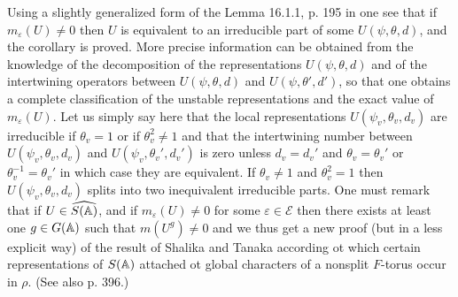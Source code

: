 Using a slightly generalized form of the Lemma 16.1.1, p. 195 in \cite{jacquet1970automorphic} one see that if $m_\varepsilon(U) \ne 0$ then $U$ is equivalent to an irreducible part of some $U(\psi, \theta, d)$, and the corollary is proved.
More precise information can be obtained from the knowledge of the decomposition of the representations $U(\psi, \theta, d)$ and of the intertwining operators between $U(\psi, \theta, d)$ and $U(\psi, \theta', d')$, so that one obtains a complete classification of the unstable representations and the exact value of $m_\varepsilon(U)$.
Let us simply say here that the local representations $U(\psi_v, \theta_v, d_v)$ are irreducible if $\theta_v = 1$ or if $\theta_v^2 \ne 1$ and that the intertwining number between $U(\psi_v, \theta_v, d_v)$ and $U(\psi_v, \theta_v', d_v')$ is zero unless $d_v = d_v'$ and $\theta_v = \theta_v'$ or $\theta_v^{-1} = \theta_v'$ in which case they are equivalent.
If $\theta_v \ne 1$ and $\theta_v^2 = 1$ then $U(\psi_v, \theta_v, d_v)$ splits into two inequivalent irreducible parts.
One must remark that if $U \in \widehat{S(\mathbb{A})}$, and if $m_\varepsilon(U) \ne 0$ for some $\varepsilon \in \mathscr{E}$ then there exists at least one $g \in G(\mathbb{A})$ such that $m(U^g) \ne 0$ and we thus get a new proof (but in a less explicit way) of the result of Shalika and Tanaka \cite{shalika1969explicit} according ot which certain representations of $S(\mathbb{A})$ attached ot global characters of a nonsplit $F$-torus occur in $\rho$. (See also \cite{jacquet1970automorphic} p. 396.)

